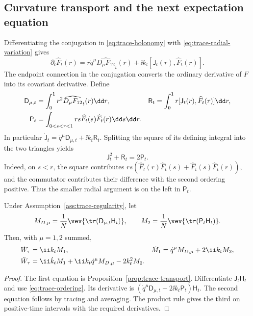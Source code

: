 \subsection{Curvature transport and the next expectation equation}

Differentiating the conjugation in \eqref{eq:trace-holonomy}
with \eqref{eq:trace-radial-variation} gives
\begin{equation}\label{eq:trace-curvature-flow}
 \partial_t\widehat F_t(r)
 =r\dot q^\mu\widehat{D_\mu F_{12}}_t(r)
                      +\ii k_t[\mathsf J_t(r),\widehat F_t(r)].
\end{equation}
The endpoint connection in the conjugation converts the ordinary
derivative of $F$ into its covariant derivative. Define
\begin{align}\label{eq:trace-second-moments}
 \mathsf D_{\mu,t}&=\int_0^1r^2\widehat{D_\mu F_{12}}_t(r)\dd r,
 &\mathsf R_t&=\int_0^1r[\mathsf J_t(r),\widehat F_t(r)]\dd r,\\
 \mathsf P_t&=\int_{0<s<r<1}rs\widehat F_t(s)\widehat F_t(r)\dd s\dd r.
 \notag
\end{align}
In particular $\dot{\mathsf J}_t=\dot q^\mu\mathsf D_{\mu,t}
+\ii k_t\mathsf R_t$. Splitting the square of its defining
integral into the two triangles yields
\begin{equation}\label{eq:trace-ordering}
 \mathsf J_t^2+\mathsf R_t=2\mathsf P_t.
\end{equation}
Indeed, on $s<r$, the square contributes
$rs(\widehat F_t(r)\widehat F_t(s)+\widehat F_t(s)\widehat F_t(r))$,
and the commutator contributes their difference with the second
ordering positive. Thus the smaller radial argument is on the left
in $\mathsf P_t$.

\begin{proposition}
Under Assumption~\ref{ass:trace-regularity}, let
\[
 M_{D,\mu}=\frac1N\vev{\tr(\mathsf D_{\mu,t}\mathsf H_t)},\qquad
 M_2=\frac1N\vev{\tr(\mathsf P_t\mathsf H_t)}.
\]
Then, with $\mu=1,2$ summed,
\begin{align}\label{eq:trace-hierarchy}
 \dot W_\tau&=\ii k_t M_1, &
 \dot M_1&=\dot q^\mu M_{D,\mu}+2\ii k_t M_2,\\
 \ddot W_\tau&=\ii\dot k_tM_1+\ii k_t\dot q^\mu M_{D,\mu}
                                      -2k_t^2M_2.
 \notag
\end{align}
\end{proposition}
\begin{proof}
The first equation is Proposition~\ref{prop:trace-transport}.
Differentiate $\mathsf J_t\mathsf H_t$ and use
\eqref{eq:trace-ordering}. Its derivative is
$(\dot q^\mu\mathsf D_{\mu,t}+2\ii k_t\mathsf P_t)\mathsf H_t$.
The second equation follows by tracing and averaging. The product
rule gives the third on positive-time intervals with the required
derivatives.
\end{proof}

